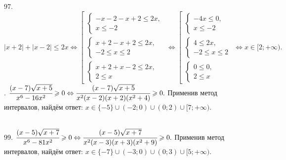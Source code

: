 \documentclass[12pt]{article}
\begin{document}
97. $|x+2|+|x-2|\leqslant2x\Leftrightarrow\left[\begin{array}{l}\begin{cases}-x-2-x+2\leqslant2x,\\ x\leqslant-2\end{cases}\\
\begin{cases}x+2-x+2\leqslant2x,\\ -2\leqslant x \leqslant 2\end{cases}\\
\begin{cases}x+2+x-2\leqslant2x,\\ 2\leqslant x \end{cases}
\end{array}\right.\Leftrightarrow\left[\begin{array}{l}\begin{cases}-4x\leqslant0,\\ x\leqslant-2\end{cases}\\
\begin{cases}4\leqslant2x,\\ -2\leqslant x \leqslant 2\end{cases}\\
\begin{cases}0\leqslant0,\\ 2\leqslant x \end{cases}
\end{array}\right.\Leftrightarrow x\in[2;+\infty).$\newpage{}. $\cfrac{(x-7)\sqrt{x+5}}{x^6-16x^2}\geqslant0\Leftrightarrow
\cfrac{(x-7)\sqrt{x+5}}{x^2(x-2)(x+2)(x^2+4)}\geqslant0.$ Применив метод интервалов, найдём ответ: $x\in\{-5\}\cup(-2;0)\cup(0;2)\cup[7;+\infty).$
\begin{figure}[ht!]
\end{figure}\\
99. $\cfrac{(x-5)\sqrt{x+7}}{x^6-81x^2}\geqslant0\Leftrightarrow
\cfrac{(x-5)\sqrt{x+7}}{x^2(x-3)(x+3)(x^2+9)}\geqslant0.$ Применив метод интервалов, найдём ответ: $x\in\{-7\}\cup(-3;0)\cup(0;3)\cup[5;+\infty).$
\end{document}
